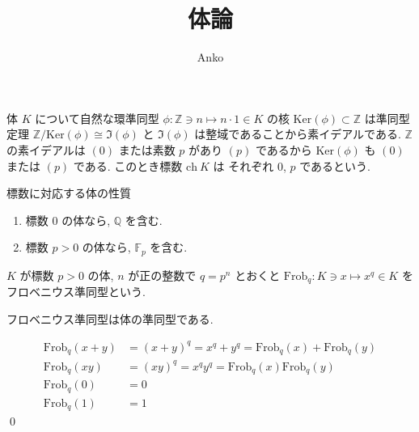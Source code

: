 \documentclass[uplatex,dvipdfmx,a4paper,11pt]{jlreq}
\title{体論}
\author{Anko}
\makeatletter
\theoremstyle{definition}
\renewenvironment{proof}[1][\proofname]{\par
  \normalfont
  \topsep6\p@\@plus6\p@ \trivlist
  \item[\hskip\labelsep{\bfseries #1}\@addpunct{\bfseries}]\ignorespaces\quad\par
}{%
  \qed\endtrivlist\@endpefalse
}
\renewcommand\proofname{証明}
\makeatother
\begin{document}
\maketitle
\tableofcontents
\clearpage

\begin{definition}
  体 $K$ について自然な環準同型 $\phi:\mathbb{Z}\ni n\mapsto n\cdot 1\in K$ の核 $\mathrm{Ker}(\phi)\subset\mathbb{Z}$ は準同型定理 $\mathbb{Z}/\mathrm{Ker}(\phi)\cong\Im(\phi)$ と $\Im(\phi)$ は整域であることから素イデアルである. $\mathbb{Z}$ の素イデアルは $(0)$ または素数 $p$ があり $(p)$ であるから $\mathrm{Ker}(\phi)$ も $(0)$ または $(p)$ である. このとき標数 $\mathrm{ch}\ K$ は それぞれ $0$, $p$ であるという.
\end{definition}
\begin{theorem}
  標数に対応する体の性質
  \begin{enumerate}
    \item 標数 $0$ の体なら, $\mathbb{Q}$ を含む.
    \item 標数 $p > 0$ の体なら, $\mathbb{F}_p$ を含む.
  \end{enumerate}
\end{theorem}

\begin{definition}
  $K$ が標数 $p>0$ の体, $n$ が正の整数で $q = p^n$ とおくと $\mathrm{Frob}_q:K\ni x\mapsto x^q\in K$ をフロベニウス準同型という.
\end{definition}

\begin{theorem}
  フロベニウス準同型は体の準同型である.
\end{theorem}
\begin{proof}
  \begin{align}
    \mathrm{Frob}_q(x + y) & = (x + y)^q = x^q + y^q = \mathrm{Frob}_q(x) + \mathrm{Frob}_q(y) \\
    \mathrm{Frob}_q(xy)    & = (xy)^q = x^qy^q = \mathrm{Frob}_q(x)\mathrm{Frob}_q(y)          \\
    \mathrm{Frob}_q(0)     & = 0                                                               \\
    \mathrm{Frob}_q(1)     & = 1
  \end{align}
\end{proof}
\end{document}

